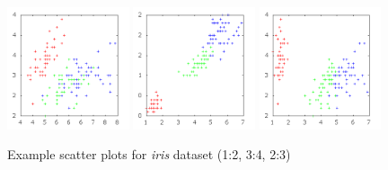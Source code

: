 \documentclass[]{article}
\begin{document}
\begin{figure}[hbt]
	\centering
	\includegraphics[width=0.32\textwidth, trim = 10 0 20 0]{figures/scatterplot_1_2}
	\includegraphics[width=0.32\textwidth, trim = 10 0 20 0]{figures/scatterplot_3_4}
	\includegraphics[width=0.32\textwidth, trim = 10 0 20 0]{figures/scatterplot_2_3}
  	\caption{Example scatter plots for \emph{iris} dataset (1:2, 3:4, 2:3)}
  	\label{fig:scatterplots}
\end{figure}
\end{document}
